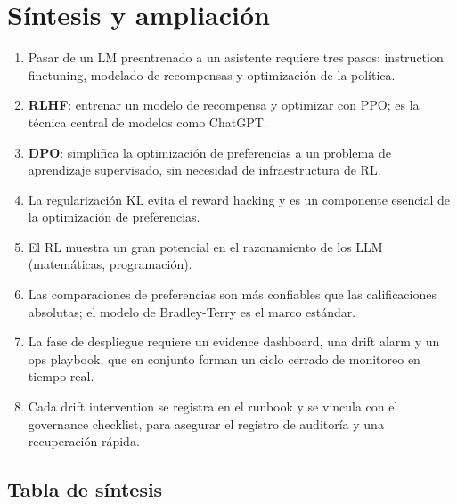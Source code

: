 \section{Síntesis y ampliación}

\begin{enumerate}
    \item Pasar de un LM preentrenado a un asistente requiere tres pasos: instruction finetuning, modelado de recompensas y optimización de la política.
    \item \textbf{RLHF}: entrenar un modelo de recompensa y optimizar con PPO; es la técnica central de modelos como ChatGPT.
    \item \textbf{DPO}: simplifica la optimización de preferencias a un problema de aprendizaje supervisado, sin necesidad de infraestructura de RL.
    \item La regularización KL evita el reward hacking y es un componente esencial de la optimización de preferencias.
    \item El RL muestra un gran potencial en el razonamiento de los LLM (matemáticas, programación).
    \item Las comparaciones de preferencias son más confiables que las calificaciones absolutas; el modelo de Bradley-Terry es el marco estándar.
    \item La fase de despliegue requiere un evidence dashboard, una drift alarm y un ops playbook, que en conjunto forman un ciclo cerrado de monitoreo en tiempo real.
    \item Cada drift intervention se registra en el runbook y se vincula con el governance checklist, para asegurar el registro de auditoría y una recuperación rápida.
\end{enumerate}

\subsection{Tabla de síntesis}


